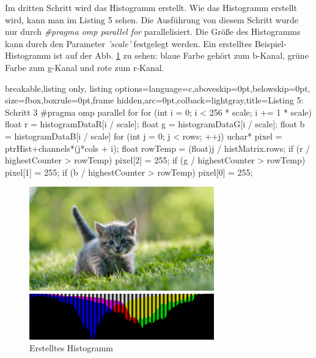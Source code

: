 \documentclass[11pt]{amsart}
\begin{document}
   Im dritten Schritt wird das Histogramm erstellt. Wie das Histogramm erstellt wird, kann man im Listing 5 sehen. Die Ausführung von diesem Schritt wurde nur durch \textit{\#pragma omp parallel for} parallelisiert. Die Größe des Histogramms kann durch den Parameter \textit{'scale'} festgelegt werden. Ein erstelltes Beispiel-Histogramm ist auf der Abb. \ref{fig:histExample} zu sehen: blaue Farbe gehört zum b-Kanal, grüne Farbe zum g-Kanal und rote zum r-Kanal.
 
   \begin{tcblisting}{breakable,listing only,
  listing options={language=c,aboveskip=0pt,belowskip=0pt},
  size=fbox,boxrule=0pt,frame hidden,arc=0pt,colback=lightgray,title=Listing 5: Schritt 3}      
#pragma omp parallel for
       for (int i = 0; i < 256 * scale; i += 1 * scale) {
           float r = histogramDataR[i / scale];
           float g = histogramDataG[i / scale];
           float b = histogramDataB[i / scale]         
           for (int j = 0; j < rows; ++j) {
               uchar* pixel = ptrHist+channels*(j*cols + i);
               float rowTemp = (float)j / histMatrix.rows;
               if (r / highestCounter > rowTemp) {
                   pixel[2] = 255;
               }  
               if (g / highestCounter > rowTemp) {
                   pixel[1] = 255;
               }
               if (b / highestCounter > rowTemp) {
                   pixel[0] = 255;
               }
           }
       }
\end{tcblisting}


\newpage
\begin{figure}[thb!]
\begin{minipage}{8cm}
\includegraphics[width=8cm]{images/original.jpg}
\end{minipage}
\qquad
\begin{minipage}{8cm}
\includegraphics[width=8cm]{images/myHisto.png}
\end{minipage}
\caption{Erstelltes Histogramm}
\label{fig:histExample}
\end{figure}
\end{document}
